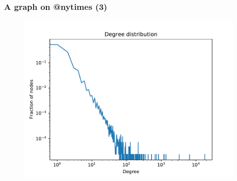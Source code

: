 \documentclass{beamer}
\begin{document}

\begin{frame}[c]
    \frametitle{A graph on @nytimes (3)}
    \begin{figure}[htpb]
        \centering
        \includegraphics[width=0.8\linewidth]{out/nytimes400/degree-dist.pdf}
    \end{figure}
\end{frame}
\end{document}
